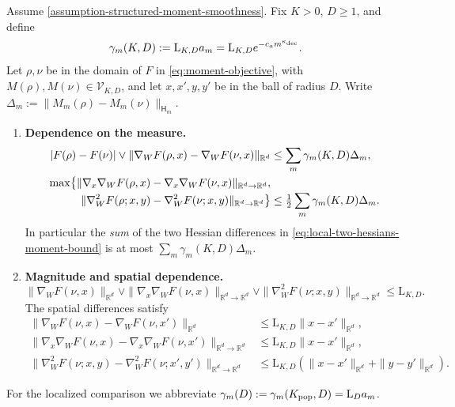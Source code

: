 \begin{lemma}
\label{lemma-localized-moment-smoothness-consequences}
Assume \cref{assumption-structured-moment-smoothness}. Fix $K>0$, $D\ge1$,
and define
\begin{equation}
\label{eq:common-local-moment-weights}
 \gamma_m(K,D):=\mathrm L_{K,D}a_m
              =\mathrm L_{K,D}e^{-c_am^{\kappa_{\rm dec}}}.
\end{equation}
Let $\rho,\nu$ be in the domain of $F$ in
\cref{eq:moment-objective}, with
$M(\rho),M(\nu)\in\mathcal V_{K,D}$, and let $x,x',y,y'$ be in
the ball of radius $D$. Write
$\Delta_m:=\|M_m(\rho)-M_m(\nu)\|_{\mathsf H_m}$.
\begin{enumerate}[label=(\roman*),leftmargin=*]
\item \textbf{Dependence on the measure.}
\begin{align}
 |F(\rho)-F(\nu)|\vee
 \|\nabla_WF(\rho,x)-\nabla_WF(\nu,x)\|_{\mathbb R^d}
 &\le\sum_m\gamma_m(K,D)\Delta_m,
 \label{eq:local-value-gradient-moment-bound}\\
 \max\bigl\{\|\nabla_x\nabla_WF(\rho,x)-\nabla_x\nabla_WF(\nu,x)\|_{\mathbb R^d\to\mathbb R^d},
 &\notag\\[-0.5ex]
 \|\nabla_W^2F(\rho;x,y)-\nabla_W^2F(\nu;x,y)\|_{\mathbb R^d\to\mathbb R^d}\bigr\}
 &\le\tfrac12\sum_m\gamma_m(K,D)\Delta_m.
 \label{eq:local-two-hessians-moment-bound}
\end{align}
In particular the \emph{sum} of the two Hessian differences in
\eqref{eq:local-two-hessians-moment-bound} is at most
$\sum_m\gamma_m(K,D)\Delta_m$.
\item \textbf{Magnitude and spatial dependence.}
\begin{equation}
\label{eq:local-field-magnitude-bound}
 \|\nabla_WF(\nu,x)\|_{\mathbb R^d}\vee
 \|\nabla_x\nabla_WF(\nu,x)\|_{\mathbb R^d\to\mathbb R^d}\vee
 \|\nabla_W^2F(\nu;x,y)\|_{\mathbb R^d\to\mathbb R^d}\le\mathrm L_{K,D}.
\end{equation}
The spatial differences satisfy
\begin{align}
 \|\nabla_WF(\nu,x)-\nabla_WF(\nu,x')\|_{\mathbb R^d}
 &\le\mathrm L_{K,D}\|x-x'\|_{\mathbb R^d},
 \label{eq:local-gradient-spatial-bound}\\
 \|\nabla_x\nabla_WF(\nu,x)-\nabla_x\nabla_WF(\nu,x')\|_{\mathbb R^d\to\mathbb R^d}
 &\le\mathrm L_{K,D}\|x-x'\|_{\mathbb R^d},
 \label{eq:local-jacobian-spatial-bound}\\
 \|\nabla_W^2F(\nu;x,y)-\nabla_W^2F(\nu;x',y')\|_{\mathbb R^d\to\mathbb R^d}
 &\le\mathrm L_{K,D}(\|x-x'\|_{\mathbb R^d}+\|y-y'\|_{\mathbb R^d}).
 \label{eq:local-kernel-spatial-bound}
\end{align}
\end{enumerate}
For the localized comparison we abbreviate
$\gamma_m(D):=\gamma_m(K_{\rm pop},D)=\mathrm L_Da_m$.
\end{lemma}

